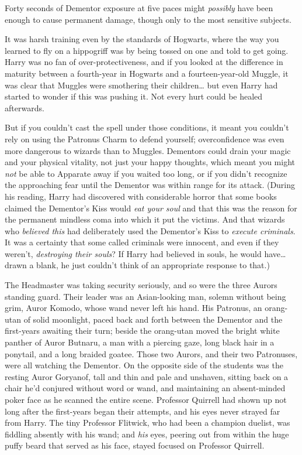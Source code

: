Forty seconds of Dementor exposure at five paces might \emph{possibly} have been enough to cause permanent damage, though only to the most sensitive subjects.

It was harsh training even by the standards of Hogwarts, where the way you learned to fly on a hippogriff was by being tossed on one and told to get going. Harry was no fan of over-protectiveness, and if you looked at the difference in maturity between a fourth-year in Hogwarts and a fourteen-year-old Muggle, it was clear that Muggles were smothering their children{\ldots} but even Harry had started to wonder if this was pushing it. Not every hurt could be healed afterwards.

But if you couldn't cast the spell under those conditions, it meant you couldn't rely on using the Patronus Charm to defend yourself; overconfidence was even more dangerous to wizards than to Muggles. Dementors could drain your magic and your physical vitality, not just your happy thoughts, which meant you might \emph{not} be able to Apparate away if you waited too long, or if you didn't recognize the approaching fear until the Dementor was within range for its attack. (During his reading, Harry had discovered with considerable horror that some books claimed the Dementor's Kiss would \emph{eat your soul} and that this was the reason for the permanent mindless coma into which it put the victims. And that wizards who \emph{believed this} had deliberately used the Dementor's Kiss to \emph{execute criminals}. It was a certainty that some called criminals were innocent, and even if they weren't, \emph{destroying their souls}? If Harry had believed in souls, he would have{\ldots} drawn a blank, he just couldn't think of an appropriate response to that.)

The Headmaster was taking security seriously, and so were the three Aurors standing guard. Their leader was an Asian-looking man, solemn without being grim, Auror Komodo, whose wand never left his hand. His Patronus, an orang-utan of solid moonlight, paced back and forth between the Dementor and the first-years awaiting their turn; beside the orang-utan moved the bright white panther of Auror Butnaru, a man with a piercing gaze, long black hair in a ponytail, and a long braided goatee. Those two Aurors, and their two Patronuses, were all watching the Dementor. On the opposite side of the students was the resting Auror Goryanof, tall and thin and pale and unshaven, sitting back on a chair he'd conjured without word or wand, and maintaining an absent-minded poker face as he scanned the entire scene. Professor Quirrell had shown up not long after the first-years began their attempts, and his eyes never strayed far from Harry. The tiny Professor Flitwick, who had been a champion duelist, was fiddling absently with his wand; and \emph{his} eyes, peering out from within the huge puffy beard that served as his face, stayed focused on Professor Quirrell.


